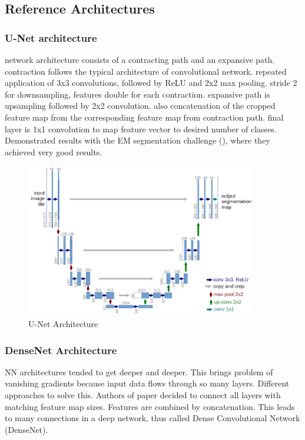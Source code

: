 \subsection{Reference Architectures}

\subsubsection{U-Net architecture}
\cite{unet15}
network architecture consists of a contracting path and an expansive path. contraction follows the typical architecture of convolutional network. repeated application of 3x3 convolutions, followed by ReLU and 2x2 max pooling. stride 2 for downsampling, features double for each contraction.
expansive path is upsampling followed by 2x2 convolution. also concatenation of the cropped feature map from the corresponding feature map from contraction path.
final layer is 1x1 convolution to map feature vector to desired number of classes. Demonstrated results with the EM segmentation challenge (\cite{isbi_challenge}), where they achieved very good results.

\begin{figure}[h]
    \centering
    \includegraphics[width=0.9\textwidth]{images/u-net-architecture}
    \caption{U-Net Architecture \cite{unet15}}
    \label{fig:unet_architecture}
\end{figure}

\subsubsection{DenseNet Architecture}
\cite{densenet18}
NN architectures tended to get deeper and deeper. This brings problem of vanishing gradients because input data flows through so many layers. Different approaches to solve this. Authors of paper decided to connect all layers with matching feature map sizes. Features are combined by concatenation. This leads to many connections in a deep network, thus called Dense Convolutional Network (DenseNet).

